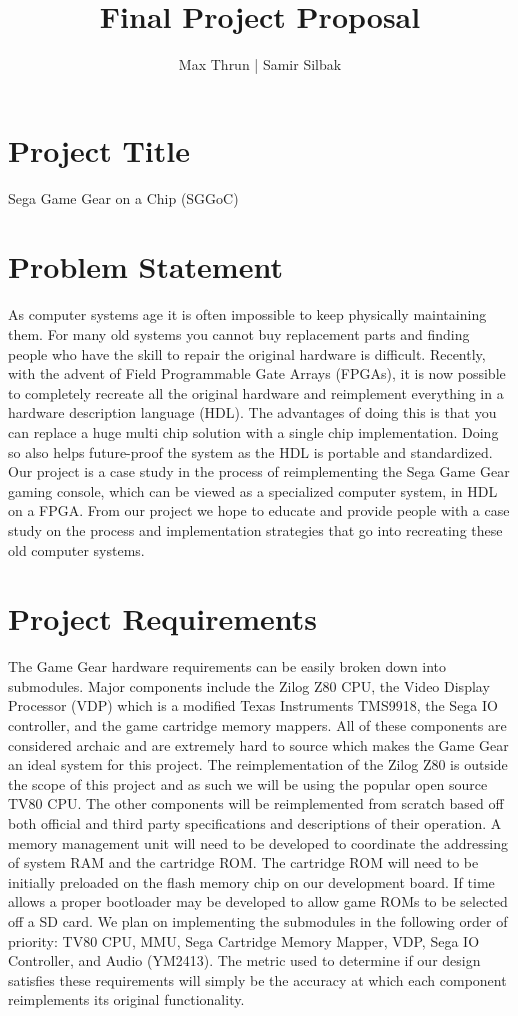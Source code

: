 \documentclass[11pt]{article}
\title{Final Project Proposal}
\author{ Max Thrun | Samir Silbak }
\begin{document}
\maketitle

\section*{Project Title}
Sega Game Gear on a Chip (SGGoC)

\section*{Problem Statement}
As computer systems age it is often impossible to keep physically maintaining them.
For many old systems you cannot buy replacement parts and finding people who have the skill
to repair the original hardware is difficult. Recently, with the advent of Field Programmable
Gate Arrays (FPGAs), it is now possible to completely recreate all the original hardware and reimplement
everything in a hardware description language (HDL). The advantages of doing this is that you can
replace a huge multi chip solution with a single chip implementation. Doing so also helps future-proof
the system as the HDL is portable and standardized. Our project is a case study in the process of
reimplementing the Sega Game Gear gaming console, which can be viewed as a specialized computer system, in HDL on a FPGA.
From our project we hope to educate and provide people with a case study on the process and implementation 
strategies that go into recreating these old computer systems.

\section*{Project Requirements}
The Game Gear hardware requirements can be easily broken down into submodules. Major components include the Zilog Z80 CPU, 
the Video Display Processor (VDP) which is a modified Texas Instruments TMS9918, the Sega IO controller, and the
game cartridge memory mappers. All of these components are considered archaic and are extremely hard to source which makes
the Game Gear an ideal system for this project. The reimplementation of the Zilog Z80 is outside the scope of this project and as such
we will be using the popular open source TV80 CPU. The other components will be reimplemented from scratch based off both official and 
third party specifications and descriptions of their operation. A memory management unit will need to be developed to coordinate the 
addressing of system RAM and the cartridge ROM. The cartridge ROM will need to be initially preloaded on the flash memory chip on
our development board. If time allows a proper bootloader may be developed to allow game ROMs to be selected off a
SD card. We plan on implementing the submodules in the following order of priority: TV80 CPU, MMU, Sega Cartridge Memory Mapper, VDP,
Sega IO Controller, and Audio (YM2413). The metric used to determine if our design satisfies these requirements will simply
be the accuracy at which each component reimplements its original functionality.
\end{document}
